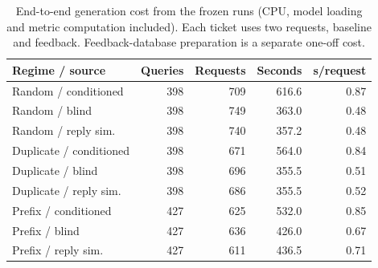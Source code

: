 \begin{table}[t]
\centering
\caption{End-to-end generation cost from the frozen runs (CPU, model loading and
metric computation included). Each ticket uses two requests, baseline and
feedback. Feedback-database preparation is a separate one-off cost.}
\label{tab:cost}
\begin{tabular}{@{}lrrrr@{}}
\toprule
Regime / source & Queries & Requests & Seconds & s/request \\
\midrule
Random / conditioned    & 398 & 709 & 616.6 & 0.87 \\
Random / blind          & 398 & 749 & 363.0 & 0.48 \\
Random / reply sim.     & 398 & 740 & 357.2 & 0.48 \\
Duplicate / conditioned & 398 & 671 & 564.0 & 0.84 \\
Duplicate / blind       & 398 & 696 & 355.5 & 0.51 \\
Duplicate / reply sim.  & 398 & 686 & 355.5 & 0.52 \\
Prefix / conditioned    & 427 & 625 & 532.0 & 0.85 \\
Prefix / blind          & 427 & 636 & 426.0 & 0.67 \\
Prefix / reply sim.     & 427 & 611 & 436.5 & 0.71 \\
\bottomrule
\end{tabular}
\end{table}
